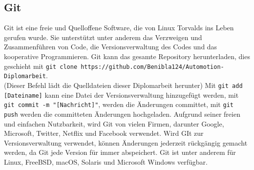 \subsection{Git}
\label{subsec:tGit}
Git ist eine freie und Quelloffene Software, die von Linux Torvalds ins Leben gerufen wurde. Sie unterstützt unter anderem das Verzweigen und Zusammenführen von Code, die Versionsverwaltung des Codes und das kooperative Programmieren. Git kann das gesamte Repository herunterladen, dies geschieht mit \verb|git clone https://github.com/Benibla124/Automotion-Diplomarbeit|. \\ (Dieser Befehl lädt die Quelldateien dieser Diplomarbeit herunter) Mit \verb|git add [Dateiname]| kann eine Datei der Versionsverwaltung hinzugefügt werden, mit \verb|git commit -m "[Nachricht]"|, werden die Änderungen committet, mit \verb|git push| werden die committeten Änderungen hochgeladen. Aufgrund seiner freien und einfachen Nutzbarkeit, wird Git von vielen Firmen, darunter Google, Microsoft, Twitter, Netflix und Facebook verwendet. Wird GIt zur Versionsverwaltung verwendet, können Änderungen jederzeit rückgängig gemacht werden, da Git jede Version für immer abspeichert. Git ist unter anderem für Linux, FreeBSD, macOS, Solaris und Microsoft Windows verfügbar.